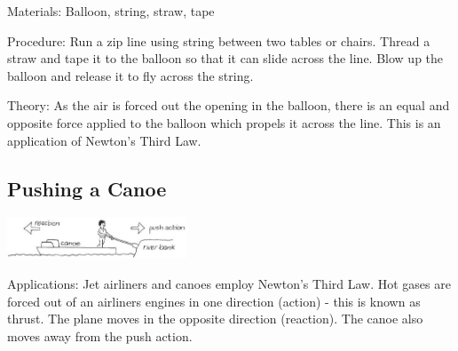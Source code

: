 \begin{multicols}{2}
\begin{description*}
\item[Materials:]{Balloon, string, straw, tape}
\item[Procedure:]{Run a zip line using string between two tables or chairs. Thread a straw and tape it to the balloon so that it can slide across the line. Blow up the balloon and release it to fly across the string.}
\item[Theory:]{As the air is forced out the opening in the balloon, there is an equal and opposite force applied to the balloon which propels it across the line. This is an application of Newton's Third Law.}
\end{description*}

\subsection{Pushing a Canoe}

\begin{center}
\includegraphics[width=0.4\textwidth]{./img/vso/canoe-push.png}
\end{center}

\begin{description*}
\item[Applications:]{Jet airliners and canoes employ Newton's Third Law. Hot gases are forced out of an airliners engines in one direction (action) - this is known as thrust. The plane moves in the opposite direction (reaction). The canoe also moves away from the push action.}
\end{description*}


\end{multicols}
